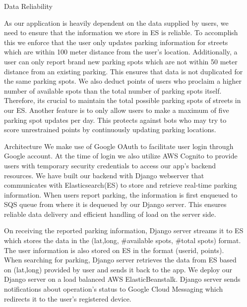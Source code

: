 \documentclass[final]{beamer}
\newlength{\onecolwid}
\newlength{\twocolwid}
\begin{document}
\begin{frame}[t]
\begin{columns}[t]
\begin{column}{\twocolwid}
\end{column} %

\begin{column}{\onecolwid} %

\begin{block}{Data Reliability}

As our application is heavily dependent on the data supplied by users, we need to ensure that the information we store in ES is reliable. To accomplish this we enforce that the user only updates parking information for streets which are within 100 meter distance from the user's location. Additionally, a user can only report brand new parking spots which are not within 50 meter distance from an existing parking. This ensures that data is not duplicated for the same parking spots. We also deduct points of users who proclaim a higher number of available spots than the total number of parking spots itself. Therefore, its crucial to maintain the total possible parking spots of streets in our ES. Another feature is to only allow users to make a maximum of five parking spot updates per day. This protects against bots who may try to score unrestrained points by continuously updating parking locations. 
\end{block}


\begin{block}{Architecture}
We make use of Google OAuth to facilitate user login through Google account. At the time of login we also utilize AWS Cognito to provide users with temporary security credentials to access our app's backend resources. We have built our backend with Django webserver that communicates with Elasticsearch(ES) to store and retrieve real-time parking information. When users report parking, the information is first enqueued to SQS queue from where it is dequeued by our Django server. This ensures reliable data delivery and efficient handling of load on the server side.

On receiving the reported parking information, Django server streams it to ES which stores the data in the (lat,long, \#available spots, \#total spots) format. The user information is also stored on ES in the format (userid, points). When searching for parking, Django server retrieves the data from ES based on (lat,long) provided by user and sends it back to the app. We deploy our Django server on a load balanced AWS ElasticBeanstalk. Django server sends notifications about operation's status to Google Cloud Messaging which redirects it to the user's registered device.
\end{block}



\end{column}
\end{columns}
\end{frame}
\end{document}
